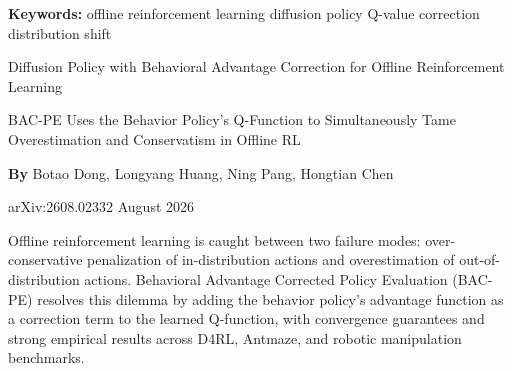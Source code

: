 \documentclass[10pt,twocolumn]{article}
\begin{document}
\setlength{\parindent}{0pt}
\setlength{\parskip}{4pt}

{\small\color{keywordgray}\textbf{Keywords:}
  offline reinforcement learning \textbullet{}
  diffusion policy \textbullet{}
  Q-value correction \textbullet{}
  distribution shift}\par\vspace{4pt}

{\LARGE\bfseries\raggedright
  Diffusion Policy with Behavioral Advantage Correction
  for Offline Reinforcement Learning}\par\vspace{4pt}

{\large\itshape\raggedright
  BAC-PE Uses the Behavior Policy's Q-Function to Simultaneously
  Tame Overestimation and Conservatism in Offline RL}\par\vspace{6pt}

{\small\textbf{By} Botao Dong, Longyang Huang, Ning Pang,
  Hongtian Chen}\par\vspace{2pt}

{\small\color{keywordgray}arXiv:2608.02332 \textbullet{} August 2026}
\par\vspace{2pt}\noindent{\color{rulered}\rule{\columnwidth}{0.6pt}}\vspace{6pt}

Offline reinforcement learning is caught between two failure modes: over-conservative
penalization of in-distribution actions and overestimation of out-of-distribution
actions. Behavioral Advantage Corrected Policy Evaluation (BAC-PE) resolves this
dilemma by adding the behavior policy's advantage function as a correction term to
the learned Q-function, with convergence guarantees and strong empirical results
across D4RL, Antmaze, and robotic manipulation benchmarks.
\end{document}
